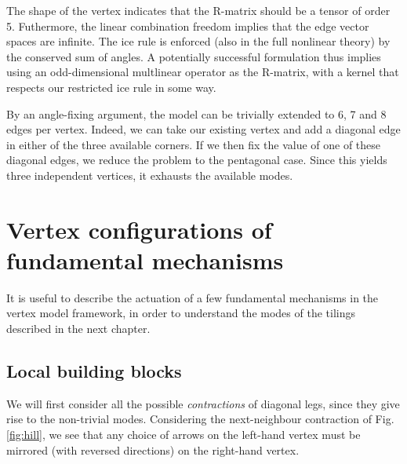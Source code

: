 		The shape of the vertex indicates that the R-matrix should be a tensor of order 5. Futhermore, the linear combination freedom implies that the edge vector spaces are infinite. The ice rule is enforced (also in the full nonlinear theory) by the conserved sum of angles. A potentially successful formulation thus implies using an odd-dimensional multlinear operator as the R-matrix, with a kernel that respects our restricted ice rule in some way.
		
		By an angle-fixing argument, the model can be trivially extended to 6, 7 and 8 edges per vertex. Indeed, we can take our existing vertex and add a diagonal edge in either of the three available corners. If we then fix the value of one of these diagonal edges, we reduce the problem to the pentagonal case. Since this yields three independent vertices, it exhausts the available modes.
		
			
\section{Vertex configurations of fundamental mechanisms}
\label{sec:mechavertex}

	It is useful to describe the actuation of a few fundamental mechanisms in the vertex model framework, in order to understand the modes of the tilings described in the next chapter.

\subsection{Local building blocks}
\label{sec:legovertex}

	We will first consider all the possible \textit{contractions} of diagonal legs, since they give rise to the non-trivial modes. Considering the next-neighbour contraction of Fig.\ref{fig:hill}, we see that any choice of arrows on the left-hand vertex must be mirrored (with reversed directions) on the right-hand vertex.
			

